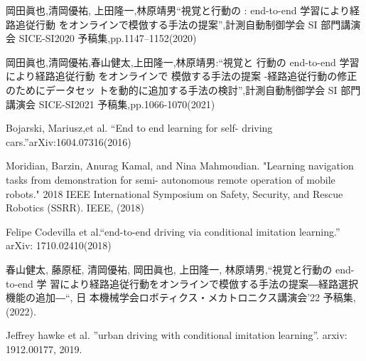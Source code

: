 \documentclass{jarticle}
\begin{document}
\footnotesize
\begin{thebibliography}{99}



岡田眞也,清岡優祐, 上田隆一,林原靖男“視覚と行動の : end-to-end 学習により経路追従行動 をオンラインで模倣する手法の提案”,計測自動制御学会 SI 部門講演会 SICE-SI2020 予稿集,pp.1147–1152(2020)

岡田眞也,清岡優祐,春山健太,上田隆一,林原靖男:“視覚と 行動の end-to-end 学習により経路追従行動 をオンラインで 模倣する手法の提案 -経路追従行動の修正のためにデータセッ トを動的に追加する手法の検討”,計測自動制御学会 SI 部門 講演会 SICE-SI2021 予稿集,pp.1066-1070(2021)

Bojarski, Mariusz,et al. “End to end learning for self- driving cars.”arXiv:1604.07316(2016)

Moridian, Barzin, Anurag Kamal, and Nina Mahmoudian. "Learning navigation tasks from demonstration for semi- autonomous remote operation of mobile robots." 2018 IEEE International Symposium on Safety, Security, and Rescue Robotics (SSRR). IEEE, (2018)

Felipe Codevilla et al.“end-to-end driving via conditional imitation learning.” arXiv: 1710.02410(2018)

春山健太, 藤原柾, 清岡優祐, 岡田眞也, 上田隆一, 林原靖男,“視覚と行動の end-to-end 学 習により経路追従行動をオンラインで模倣する手法の提案―経路選択機能の追加―“, 日 本機械学会ロボティクス・メカトロニクス講演会’22 予稿集,(2022).

Jeffrey hawke et al. ”urban driving with conditional imitation learning”. arxiv: 1912.00177, 2019.

\end{thebibliography}

\normalsize
\end{document}
